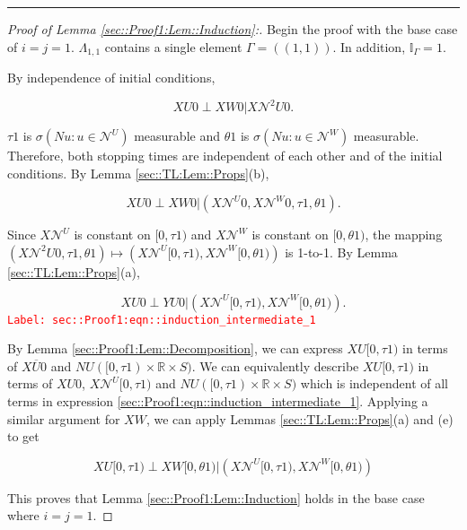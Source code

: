 \documentclass[12pt]{article}
\newcommand{\mb}{\mathbb}
\newcommand{\mc}{\mathcal}
\newcommand{\ov}{\overline}
\newcommand{\tr}{\textcolor{red}}
\newcommand{\labe}[1]{\tr{\texttt{Label: #1}}}
\newcommand{\lin}{\rule{\linewidth}{0.4 pt}}
\newcommand{\vv}{u}								%
\renewcommand{\U}{U}							%
\newcommand{\UU}{W}								%
\renewcommand{\S}{S}							%
\newcommand{\X}{X}								%
\newcommand{\neigh}{\mc{N}}						%
\newcommand{\dneigh}{\mc{N}^2}					%
\newcommand{\vind}[1]{^{#1}}					%
\newcommand{\cl}{\ov}							%
\newcommand{\poiss}{N}							%
\newcommand{\XX}{Y}								%
\newcommand{\rt}{\tau}							%
\newcommand{\rtt}{\theta}						%
\newcommand{\apath}{\Gamma}						%
\newcommand{\pathset}[2]{\Lambda_{#1,#2}}		%
\begin{document}
\lin

\begin{proof}[Proof of Lemma \ref{sec::Proof1:Lem::Induction}:]
Begin the proof with the base case of \(i=j =1\). \(\pathset{1}{1}\) contains a single element \(\apath{} = ((1,1))\). In addition, \(\mb{I}_{\apath{}} = 1\).

By independence of initial conditions,

\[\X{\U}{0}\perp \X{\UU}{0}|\X{\dneigh{\U}}{0}.\]

\(\rt{1}\) is \(\sigma\left(\poiss{\vv}:\vv\in \neigh\vind{\U}\right)\) measurable and \(\rtt{1}\) is \(\sigma\left(\poiss{\vv}:\vv\in \neigh\vind{\UU}\right)\) measurable. Therefore, both stopping times are independent of each other and of the initial conditions. By Lemma \ref{sec::TL:Lem::Props}(b), 

\[\X{\U}{0}\perp \X{\UU}{0}|\left(\X{\neigh\vind{\U}}{0},\X{\neigh\vind{\UU}}{0},\rt{1},\rtt{1}\right).\]

Since \(\X{\neigh\vind{\U}}{}\) is constant on \([0,\rt{1})\) and \(\X{\neigh\vind{\UU}}{}\) is constant on \([0,\rtt{1})\), the mapping \((\X{\dneigh{\U}}{0},\rt{1},\rtt{1}) \mapsto (\X{\neigh\vind{\U}}{[0,\rt{1})},\X{\neigh\vind{\UU}}{[0,\rtt{1})})\) is 1-to-1. By Lemma \ref{sec::TL:Lem::Props}(a),

\begin{equation}
\X{\U}{0}\perp \XX{\U}{0}|\left(\X{\neigh\vind{\U}}{[0,\rt{1})},\X{\neigh\vind{\UU}}{[0,\rtt{1})}\right).
\label{sec::Proof1:eqn::induction_intermediate_1}
\end{equation}
\labe{sec::Proof1:eqn::induction\_intermediate\_1}

By Lemma \ref{sec::Proof1:Lem::Decomposition}, we can express \(\X{\U}{[0,\rt{1})}\) in terms of \(\X{\cl{\U}}{0}\) and \(\poiss{\U}([0,\rt{1})\times\mb{R}\times\S)\). We can equivalently describe \(\X{\U}{[0,\rt{1})}\) in terms of \(\X{\U}{0}\), \(\X{\neigh\vind{\U}}{[0,\rt{1})}\) and \(\poiss{\U}([0,\rt{1})\times \mb{R}\times \S)\) which is independent of all terms in expression \eqref{sec::Proof1:eqn::induction_intermediate_1}. Applying a similar argument for \(\X{\UU}{}\), we can apply Lemmas \ref{sec::TL:Lem::Props}(a) and (e) to get

\[\X{\U}{[0,\rt{1})}\perp \X{\UU}{[0,\rtt{1})}|\left(\X{\neigh\vind{\U}}{[0,\rt{1})},\X{\neigh\vind{\UU}}{[0,\rtt{1})}\right)\]

This proves that Lemma \ref{sec::Proof1:Lem::Induction} holds in the base case where \(i = j = 1\).


\end{proof}
\end{document}
